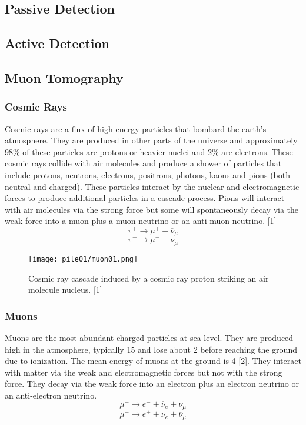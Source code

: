 \documentclass[a4paper]{article}
\begin{document}
\subsection{Passive Detection}
\subsection{Active Detection}

\subsection{Muon Tomography}
\subsubsection{Cosmic Rays}
Cosmic rays are a flux of high energy particles that bombard the earth’s atmosphere. They are
produced in other parts of the universe and approximately 98\% of these particles are protons or
heavier nuclei and 2\% are electrons. These cosmic rays collide with air molecules and produce a
shower of particles that include protons, neutrons, electrons, positrons, photons, kaons and pions
(both neutral and charged). These particles interact by the nuclear and electromagnetic forces to
produce additional particles in a cascade process. Pions will interact with air molecules via the
strong force but some will spontaneously decay via the weak force into a muon plus a muon
neutrino or an anti-muon neutrino. [1]
\begin{equation} \pi^+ \rightarrow \mu^+ + \overline{\nu}_\mu \end{equation}
\begin{equation} \pi^- \rightarrow \mu^- + \nu_\mu \end{equation}

\begin{figure}[h!]
  \texttt{[image: pile01/muon01.png]}
  \caption{Cosmic ray cascade induced by a cosmic ray proton striking
an air molecule nucleus. [1]}
\end{figure}

\subsubsection{Muons}
Muons are the most abundant charged particles at sea level. They are produced high in the
atmosphere, typically \unit{15}{\kilo\metre} and lose about \unit{2}{\giga\electronvolt} before reaching the ground due to ionization. The
mean energy of muons at the ground is \unit{4}{\giga\electronvolt} [2]. They interact with matter via the weak and
electromagnetic forces but not with the strong force. They decay via the weak force into an electron
plus an electron neutrino or an anti-electron neutrino.
\begin{equation} \mu^- \rightarrow e^- + \overline{\nu}_e + \nu_\mu \end{equation}
\begin{equation} \mu^+ \rightarrow e^+ + \nu_e + \overline{\nu}_\mu \end{equation}
\end{document}
